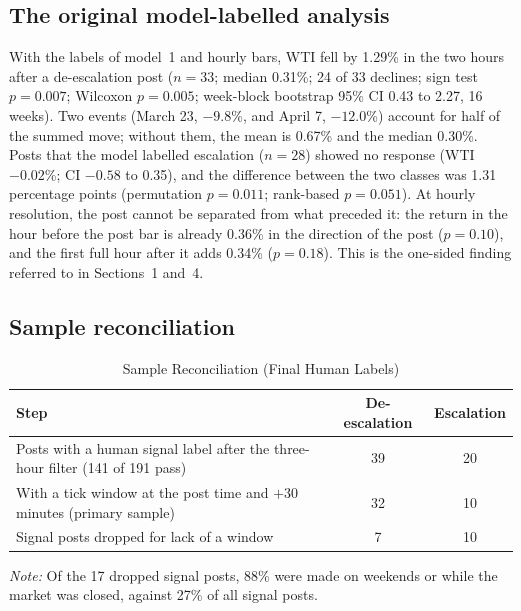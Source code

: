 \documentclass[11pt]{article}
\begin{document}
\subsection{The original model-labelled analysis}

With the labels of model~1 and hourly bars, WTI fell by 1.29\% in the two hours after a de-escalation post ($n = 33$; median 0.31\%; 24 of 33 declines; sign test $p = 0.007$; Wilcoxon $p = 0.005$; week-block bootstrap 95\% CI 0.43 to 2.27, 16 weeks). Two events (March 23, $-9.8$\%, and April 7, $-12.0$\%) account for half of the summed move; without them, the mean is 0.67\% and the median 0.30\%. Posts that the model labelled escalation ($n = 28$) showed no response (WTI $-0.02$\%; CI $-0.58$ to 0.35), and the difference between the two classes was 1.31 percentage points (permutation $p = 0.011$; rank-based $p = 0.051$). At hourly resolution, the post cannot be separated from what preceded it: the return in the hour before the post bar is already 0.36\% in the direction of the post ($p = 0.10$), and the first full hour after it adds 0.34\% ($p = 0.18$). This is the one-sided finding referred to in Sections~1 and~4.

\subsection{Sample reconciliation}

\begin{table}[h]
\centering
\small
\caption{Sample Reconciliation (Final Human Labels)}
\label{tab:sample}
\begin{tabular}{lcc}
\toprule
Step & De-escalation & Escalation \\
\midrule
Posts with a human signal label after the three-hour filter (141 of 191 pass) & 39 & 20 \\
With a tick window at the post time and $+30$ minutes (primary sample) & 32 & 10 \\
Signal posts dropped for lack of a window & 7 & 10 \\
\bottomrule
\end{tabular}

\vspace{0.5em}
\begin{minipage}{0.9\textwidth}
\footnotesize\textit{Note:} Of the 17 dropped signal posts, 88\% were made on weekends or while the market was closed, against 27\% of all signal posts.
\end{minipage}
\end{table}
\end{document}
